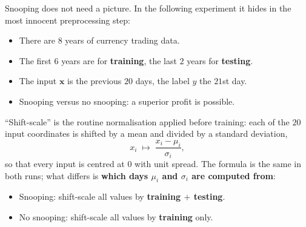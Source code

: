 Snooping does not need a picture. In the following experiment it hides in
the most innocent preprocessing step:
\begin{center}
    \begin{minipage}[c]{0.44\textwidth}
        \begin{itemize}
            \item There are \(8\) years of currency trading data.
            \item The first \(6\) years are for \textbf{training}, the last
                \(2\) years for \textbf{testing}.
            \item The input \(\bm{x}\) is the previous \(20\) days, the label
                \(y\) the \(21\)st day.
            \item Snooping versus no snooping: a superior profit is possible.
        \end{itemize}
    \end{minipage}%
    \hfill
    \begin{minipage}[c]{0.52\textwidth}
        \centering
    \end{minipage}
\end{center}

``Shift-scale'' is the routine normalisation applied before training: each
of the \(20\) input coordinates is shifted by a mean and divided by a
standard deviation,
\[
    x_i \;\longmapsto\; \frac{x_i - \mu_i}{\sigma_i},
\]
so that every input is centred at \(0\) with unit spread. The formula is the
same in both runs; what differs is \textbf{which days \(\mu_i\) and
\(\sigma_i\) are computed from}:
\begin{itemize}
    \item Snooping: shift-scale all values by \textbf{training \(+\)
        testing}.
    \item No snooping: shift-scale all values by \textbf{training} only.
\end{itemize}

